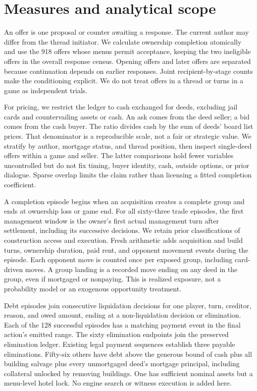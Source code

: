 \section{Measures and analytical scope}
\label{sec:methods}

An offer is one proposal or counter awaiting a response. The current author may differ from the thread initiator. We calculate ownership completion atomically and use the 918 offers whose menus permit acceptance, keeping the two ineligible offers in the overall response census. Opening offers and later offers are separated because continuation depends on earlier responses. Joint recipient-by-stage counts make the conditioning explicit. We do not treat offers in a thread or turns in a game as independent trials.

For pricing, we restrict the ledger to cash exchanged for deeds, excluding jail cards and countervailing assets or cash. An ask comes from the deed seller; a bid comes from the cash buyer. The ratio divides cash by the sum of deeds' board list prices. That denominator is a reproducible scale, not a fair or strategic value. We stratify by author, mortgage status, and thread position, then inspect single-deed offers within a game and seller. The latter comparisons hold fewer variables uncontrolled but do not fix timing, buyer identity, cash, outside options, or prior dialogue. Sparse overlap limits the claim rather than licensing a fitted completion coefficient.

A completion episode begins when an acquisition creates a complete group and ends at ownership loss or game end. For all sixty-three trade episodes, the first management window is the owner's first actual management turn after settlement, including its successive decisions. We retain prior classifications of construction access and execution. Fresh arithmetic adds acquisition and build turns, ownership duration, paid rent, and opponent movement events during the episode. Each opponent move is counted once per exposed group, including card-driven moves. A group landing is a recorded move ending on any deed in the group, even if mortgaged or nonpaying. This is realized exposure, not a probability model or an exogenous opportunity treatment.

Debt episodes join consecutive liquidation decisions for one player, turn, creditor, reason, and owed amount, ending at a non-liquidation decision or elimination. Each of the 128 successful episodes has a matching payment event in the final action's emitted range. The sixty elimination endpoints join the preserved elimination ledger. Existing legal payment sequences establish three payable eliminations. Fifty-six others have debt above the generous bound of cash plus all building salvage plus every unmortgaged deed's mortgage principal, including collateral unlocked by removing buildings. One has sufficient nominal assets but a menu-level hotel lock. No engine search or witness execution is added here.

